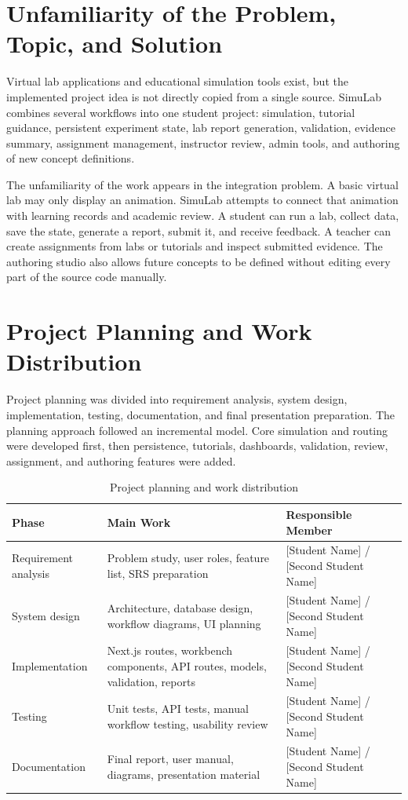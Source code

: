 \documentclass[12pt,a4paper]{report}
\begin{document}
\section{Unfamiliarity of the Problem, Topic, and Solution}
Virtual lab applications and educational simulation tools exist, but the implemented project idea is not directly copied from a single source. SimuLab combines several workflows into one student project: simulation, tutorial guidance, persistent experiment state, lab report generation, validation, evidence summary, assignment management, instructor review, admin tools, and authoring of new concept definitions.

The unfamiliarity of the work appears in the integration problem. A basic virtual lab may only display an animation. SimuLab attempts to connect that animation with learning records and academic review. A student can run a lab, collect data, save the state, generate a report, submit it, and receive feedback. A teacher can create assignments from labs or tutorials and inspect submitted evidence. The authoring studio also allows future concepts to be defined without editing every part of the source code manually.

\section{Project Planning and Work Distribution}
Project planning was divided into requirement analysis, system design, implementation, testing, documentation, and final presentation preparation. The planning approach followed an incremental model. Core simulation and routing were developed first, then persistence, tutorials, dashboards, validation, review, assignment, and authoring features were added.

\begin{table}[H]
\centering
\caption{Project planning and work distribution}
\begin{tabular}{p{} p{} p{}}
\toprule
\textbf{Phase} & \textbf{Main Work} & \textbf{Responsible Member} \\
\midrule
Requirement analysis & Problem study, user roles, feature list, SRS preparation & [Student Name] / [Second Student Name] \\
System design & Architecture, database design, workflow diagrams, UI planning & [Student Name] / [Second Student Name] \\
Implementation & Next.js routes, workbench components, API routes, models, validation, reports & [Student Name] / [Second Student Name] \\
Testing & Unit tests, API tests, manual workflow testing, usability review & [Student Name] / [Second Student Name] \\
Documentation & Final report, user manual, diagrams, presentation material & [Student Name] / [Second Student Name] \\
\bottomrule
\end{tabular}
\end{table}
\end{document}
